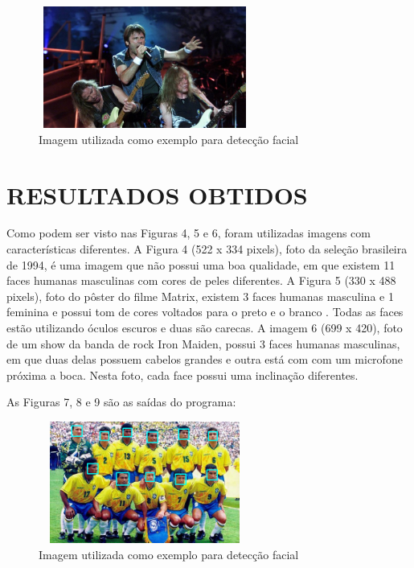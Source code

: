 \documentclass[conference]{IEEEtran}
\begin{document}
         \begin{figure}[h!b]
			\centering \includegraphics[width=7cm,height=4cm]{iron.jpg}
			\caption{Imagem utilizada como exemplo para detecção facial \cite{b7}} 
		\end{figure}

	\section{RESULTADOS OBTIDOS}
        Como podem ser visto nas Figuras 4, 5 e 6, foram utilizadas imagens com características diferentes. A Figura 4 (522 x 334 pixels), foto da seleção brasileira de 1994, é uma imagem que não possui uma boa qualidade, em que existem 11 faces humanas masculinas com cores de peles diferentes. A Figura 5 (330 x 488 pixels), foto do pôster do filme Matrix, existem 3 faces humanas masculina e 1 feminina e possui tom de cores voltados para o preto e o branco . Todas as faces estão utilizando óculos escuros e duas são carecas. A imagem 6 (699 x 420), foto de um show da banda de rock Iron Maiden, possui 3 faces humanas masculinas, em que duas delas possuem cabelos grandes e outra está com com um microfone próxima a boca. Nesta foto, cada face possui uma inclinação diferentes. 
        
        
		As Figuras 7, 8 e 9 são as saídas do programa:
		
		 \begin{figure}[h!b]
			\centering \includegraphics[width=7cm,height=4cm]{brasil_1994_detectada.png}
			\caption{Imagem utilizada como exemplo para detecção facial \cite{b5}} 
		\end{figure}
		
\end{document}
